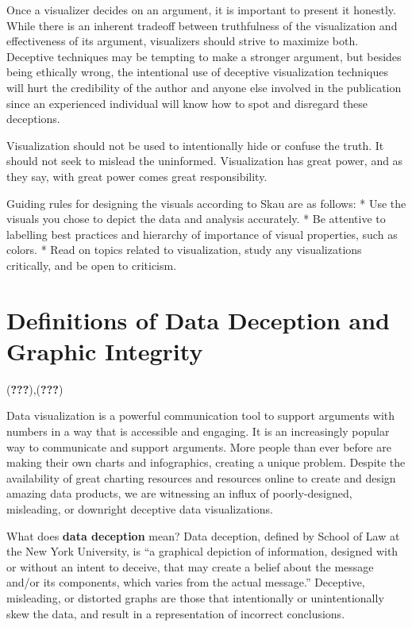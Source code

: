 \documentclass[]{book}
\begin{document}
Once a visualizer decides on an argument, it is important to present it
honestly. While there is an inherent tradeoff between truthfulness of
the visualization and effectiveness of its argument, visualizers should
strive to maximize both. Deceptive techniques may be tempting to make a
stronger argument, but besides being ethically wrong, the intentional
use of deceptive visualization techniques will hurt the credibility of
the author and anyone else involved in the publication since an
experienced individual will know how to spot and disregard these
deceptions.

Visualization should not be used to intentionally hide or confuse the
truth. It should not seek to mislead the uninformed. Visualization has
great power, and as they say, with great power comes great
responsibility.

Guiding rules for designing the visuals according to Skau are as
follows: * Use the visuals you chose to depict the data and analysis
accurately. * Be attentive to labelling best practices and hierarchy of
importance of visual properties, such as colors. * Read on topics
related to visualization, study any visualizations critically, and be
open to criticism.

\section{Definitions of Data Deception and Graphic
Integrity}\label{definitions-of-data-deception-and-graphic-integrity}

({\textbf{???}}),({\textbf{???}})

Data visualization is a powerful communication tool to support arguments
with numbers in a way that is accessible and engaging. It is an
increasingly popular way to communicate and support arguments. More
people than ever before are making their own charts and infographics,
creating a unique problem. Despite the availability of great charting
resources and resources online to create and design amazing data
products, we are witnessing an influx of poorly-designed, misleading, or
downright deceptive data visualizations.

What does \textbf{data deception} mean? Data deception, defined by
School of Law at the New York University, is ``a graphical depiction of
information, designed with or without an intent to deceive, that may
create a belief about the message and/or its components, which varies
from the actual message.'' Deceptive, misleading, or distorted graphs
are those that intentionally or unintentionally skew the data, and
result in a representation of incorrect conclusions.
\end{document}
